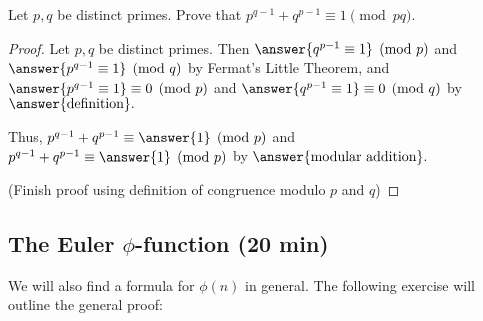 \documentclass{../ximera}
\begin{document}
\begin{br}\label{br:modpq}
  Let $p,q$ be distinct primes. Prove that $p^{q-1}+q^{p-1}\equiv 1 \pmod{pq}.$
 
 
  \begin{proof} Let $p,q$ be distinct primes. 
   Then $\answer{q^{p-1}\equiv 1}\pmod{p}$ and  $\answer{p^{q-1}\equiv 1}\pmod{q}$ by Fermat's Little Theorem, and $\answer{p^{q-1}\equiv 1}\equiv0\pmod{p}$ and  $\answer{q^{p-1}\equiv 1}\equiv 0\pmod{q}$ by $\answer{\textnormal{definition}}.$
   
   Thus, $p^{q-1}+q^{p-1}\equiv \answer{1} \pmod{p}$ and $p^{q-1}+q^{p-1}\equiv \answer{1} \pmod{p}$ by $\answer{\textnormal{modular addition}}.$

   (Finish proof using definition of congruence modulo $p$ and $q$)
  \end{proof}
\end{br}

\subsection{The Euler $\phi$-function (20 min)}\label{sec-phi-start}

We will also find a formula for $\phi(n)$ in general. The following exercise will outline the general proof:
\end{document}
